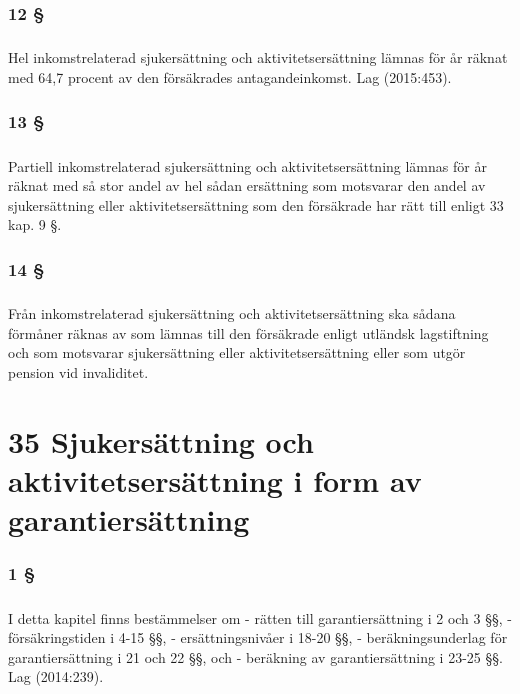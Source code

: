 \documentclass[a4paper,notitlepage,openany,10pt]{book}
\begin{document}
\subsection*{12 §}
\paragraph*{}
Hel inkomstrelaterad sjukersättning och aktivitetsersättning lämnas för år räknat med 64,7 procent av den försäkrades antagandeinkomst.
Lag (2015:453).
\subsection*{13 §}
\paragraph*{}
Partiell inkomstrelaterad sjukersättning och aktivitetsersättning lämnas för år räknat med så stor andel av hel sådan ersättning som motsvarar den andel av sjukersättning eller aktivitetsersättning som den försäkrade har rätt till enligt 33 kap. 9 §.
\subsection*{14 §}
\paragraph*{}
Från inkomstrelaterad sjukersättning och aktivitetsersättning ska sådana förmåner räknas av som lämnas till den försäkrade enligt utländsk lagstiftning och som motsvarar sjukersättning eller aktivitetsersättning eller som utgör pension vid invaliditet.
\chapter*{35 Sjukersättning och aktivitetsersättning i form av garantiersättning}
\subsection*{1 §}
\paragraph*{}
I detta kapitel finns bestämmelser om
\newline - rätten till garantiersättning i 2 och 3 §§,
\newline - försäkringstiden i 4-15 §§,
\newline - ersättningsnivåer i 18-20 §§,
\newline - beräkningsunderlag för garantiersättning i 21 och 22 §§, och
\newline - beräkning av garantiersättning i 23-25 §§.
Lag (2014:239).
\end{document}
